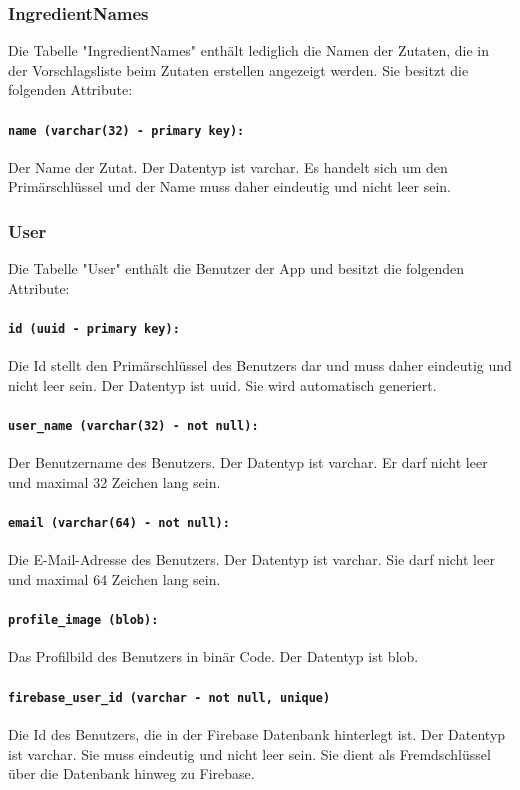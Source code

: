 \documentclass{entwurfsheft}
\begin{document}
\subsubsection{IngredientNames}
Die Tabelle "IngredientNames" enthält lediglich die Namen der Zutaten, die in der Vorschlagsliste beim Zutaten erstellen angezeigt werden. Sie besitzt die folgenden Attribute:
\paragraph{\texttt{name (varchar(32) - primary key):}} Der Name der Zutat. Der Datentyp ist \Gls{varchar}. Es handelt sich um den Primärschlüssel und der Name muss daher eindeutig und nicht leer sein.
\newpage
\subsubsection{User}
Die Tabelle "User" enthält die Benutzer der App und besitzt die folgenden Attribute:
\paragraph{\texttt{id (uuid - primary key):}} Die Id stellt den Primärschlüssel des Benutzers dar und muss daher eindeutig und nicht leer sein. Der Datentyp ist \Gls{uuid}. Sie wird automatisch generiert.
\paragraph{\texttt{user\_name (varchar(32) - not null):}} Der Benutzername des Benutzers. Der Datentyp ist \Gls{varchar}. Er darf nicht leer und maximal 32 Zeichen lang sein.
\paragraph{\texttt{email (varchar(64) - not null):}} Die E-Mail-Adresse des Benutzers. Der Datentyp ist \Gls{varchar}. Sie darf nicht leer und maximal 64 Zeichen lang sein.
\paragraph{\texttt{profile\_image (blob):}} Das Profilbild des Benutzers in binär Code. Der Datentyp ist \Gls{blob}.
\paragraph{\texttt{firebase\_user\_id (varchar - not null, unique)}} Die Id des Benutzers, die in der Firebase Datenbank hinterlegt ist. Der Datentyp ist \Gls{varchar}. Sie muss eindeutig und nicht leer sein. Sie dient als Fremdschlüssel über die Datenbank hinweg zu Firebase.
\newpage
\end{document}
